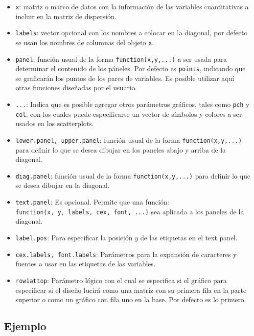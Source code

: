 \documentclass[10pt,]{krantz}
\providecommand{\tightlist}{%
  \setlength{\itemsep}{0pt}\setlength{\parskip}{0pt}}
\begin{document}
\begin{itemize}
\tightlist
\item
  \texttt{x}: matriz o marco de datos con la información de las
  variables cuantitativas a incluir en la matriz de dispersión.
\item
  \texttt{labels}: vector opcional con los nombres a colocar en la
  diagonal, por defecto se usan los nombres de columnas del objeto
  \texttt{x}.
\item
  \texttt{panel}: función usual de la forma \texttt{function(x,y,...)} a
  ser usada para determinar el contenido de los páneles. Por defecto es
  \texttt{points}, indicando que se graficarán los puntos de los pares
  de variables. Es posible utilizar aquí otras funciones diseñadas por
  el usuario.
\item
  \texttt{...}: Indica que es posible agregar otros parámetros gráficos,
  tales como \texttt{pch} y \texttt{col}, con los cuales puede
  especificarse un vector de símbolos y colores a ser usados en los
  scatterplots.
\item
  \texttt{lower.panel,\ upper.panel}: función usual de la forma
  \texttt{function(x,y,...)} para definir lo que se desea dibujar en los
  paneles abajo y arriba de la diagonal.
\item
  \texttt{diag.panel}: función usual de la forma
  \texttt{function(x,y,...)} para definir lo que se desea dibujar en la
  diagonal.
\item
  \texttt{text.panel}: Es opcional. Permite que una función:
  \texttt{function(x,\ y,\ labels,\ cex,\ font,\ ...)} sea aplicada a
  los paneles de la diagonal.
\item
  \texttt{label.pos}: Para especificar la posición \(y\) de las
  etiquetas en el text panel.
\item
  \texttt{cex.labels,\ font.labels}: Parámetros para la expansión de
  caracteres y fuentes a usar en las etiquetas de las variables.
\item
  \texttt{row1attop}: Parámetro lógico con el cual se especifica si el
  gráfico para especificar si el diseño lucirá como una matriz con su
  primera fila en la parte superior o como un gráfico con fila uno en la
  base. Por defecto es lo primero.
\end{itemize}

\subsection*{Ejemplo}\label{ejemplo-12}
\end{document}
